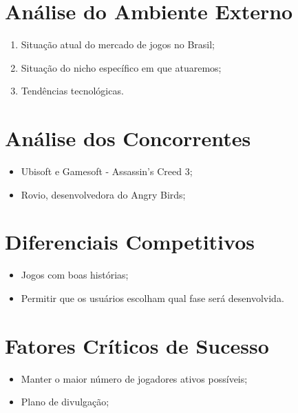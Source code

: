 \documentclass{article}
\begin{document}
        \section{Análise do Ambiente Externo}
        \begin{enumerate}
            \item Situação atual do mercado de jogos no Brasil;
            \item Situação do nicho específico em que atuaremos;
            \item Tendências tecnológicas.
        \end{enumerate}
    


        \section{Análise dos Concorrentes}
        \begin{itemize}
        	\item Ubisoft\textsuperscript{\texttrademark} e Gamesoft\textsuperscript{\texttrademark} - Assassin's Creed\textsuperscript{\textregistered} 3;
        	\item Rovio\textsuperscript{\texttrademark}, desenvolvedora do Angry Birds\textsuperscript{\textregistered};
        \end{itemize}
    

        \section{Diferenciais Competitivos}
        \begin{itemize}
        	\item Jogos com boas histórias;
        	\item Permitir que os usuários escolham qual fase será desenvolvida.
        \end{itemize}
    

        \section{Fatores Críticos de Sucesso}
        \begin{itemize}
        	\item Manter o maior número de jogadores ativos possíveis;
        	\item Plano de divulgação;
        \end{itemize}
   

   
\end{document}

